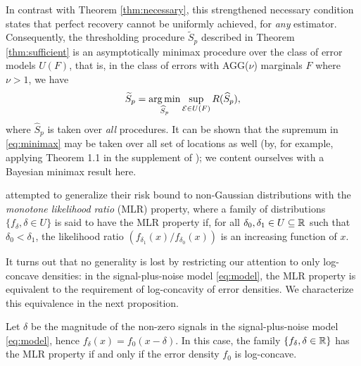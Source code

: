 \begin{remark}
In contrast with Theorem \ref{thm:necessary}, this strengthened necessary condition states that perfect recovery cannot be uniformly achieved, for \emph{any} estimator.
Consequently, the thresholding procedure $\widetilde{S}_p$ described in Theorem \ref{thm:sufficient} is an asymptotically minimax procedure over the class of error models $U(F)$, that is, in the class of errors with AGG($\nu$) marginals $F$ where $\nu>1$, we have
\begin{equation} \label{eq:minimax}
    \widetilde{S}_p = \argmin_{\widehat{S}_p} \sup_{{\cal E}\in U(F)} R(\widehat{S}_p),
\end{equation}
where $\widehat{S}_p$ is taken over \emph{all} procedures.
It can be shown that the supremum in \eqref{eq:minimax} may be taken over all set of locations as well (by, for example, applying Theorem 1.1 in the supplement of \citep{butucea2018variable});
we content ourselves with a Bayesian minimax result here.
\end{remark}

\begin{remark}
\citet{butucea2018variable} attempted to generalize their risk bound to non-Gaussian distributions with the \emph{monotone likelihood ratio} (MLR) property, where a family of distributions $\{f_\delta, \delta \in U\}$ is said to have the MLR property if, for all $\delta_0, \delta_1\in U\subseteq\mathbb R$ such that $\delta_0 < \delta_1$, the likelihood ratio $\left(f_{\delta_1}(x)/f_{\delta_0}(x)\right)$ is an increasing function of $x$.

It turns out that no generality is lost by restricting our attention to only log-concave densities: in the signal-plus-noise model \eqref{eq:model}, the MLR property is equivalent to the requirement of log-concavity of error densities. 
We characterize this equivalence in the next proposition.
\end{remark}

\begin{proposition} \label{prop:MLR-log-concavity}
Let $\delta$ be the magnitude of the non-zero signals in the signal-plus-noise model \eqref{eq:model}, hence $f_\delta(x) = f_0(x-\delta)$.
In this case, the family $\{f_\delta, \delta \in \mathbb R\}$ has the MLR property if and only if the error density $f_0$ is log-concave.
\end{proposition}


